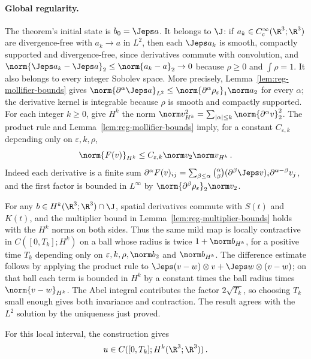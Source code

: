 \documentclass[11pt,reqno]{amsart}
\begin{document}
\paragraph{Global regularity.}
The theorem's initial state is $b_0=\Jeps a$. It belongs to $\J$: if
$a_k\in C_c^\infty(\R^3;\R^3)$ are divergence-free with $a_k\to a$ in
$L^2$, then each $\Jeps a_k$ is smooth, compactly supported and
divergence-free, since derivatives commute with convolution, and
$\norm{\Jeps a_k-\Jeps a}_2\le\norm{a_k-a}_2\to0$ because $\rho\ge0$ and
$\int\rho=1$. It also belongs to every integer Sobolev space. More
precisely,
Lemma~\ref{lem:reg-mollifier-bounds} gives
$\norm{\partial^\alpha\Jeps a}_{L^2}\le
\norm{\partial^\alpha\rho_\varepsilon}_1\norm a_2$ for every $\alpha$;
the derivative kernel is integrable because $\rho$ is smooth and compactly
supported. For each integer $k\ge0$, give $H^k$ the norm
$\norm v_{H^k}^2=\sum_{|\alpha|\le k}\norm{\partial^\alpha v}_2^2$.
The product rule and Lemma~\ref{lem:reg-mollifier-bounds} imply, for a
constant $C_{\varepsilon,k}$ depending only on $\varepsilon,k,\rho$,
\begin{equation}\label{eq:reg-hk-product}
  \norm{F(v)}_{H^k}\le C_{\varepsilon,k}\norm v_2\norm v_{H^k}\,.
\end{equation}
Indeed each derivative is a finite sum
$\partial^\alpha F(v)_{ij}=\sum_{\beta\le\alpha}\binom{\alpha}{\beta}
(\partial^\beta\Jeps v)_i\partial^{\alpha-\beta}v_j$, and the first
factor is bounded in $L^\infty$ by
$\norm{\partial^\beta\rho_\varepsilon}_2\norm v_2$.

For any $b\in H^k(\R^3;\R^3)\cap\J$, spatial derivatives commute with
$S(t)$ and $K(t)$, and the multiplier
bound in Lemma~\ref{lem:reg-multiplier-bounds} holds with the $H^k$ norms
on both sides. Thus the same mild map is locally contractive in
$C([0,T_k];H^k)$ on a ball whose radius is twice
$1+\norm b_{H^k}$, for a positive time $T_k$ depending only on
$\varepsilon,k,\rho,\norm b_2$ and $\norm b_{H^k}$. The difference
estimate follows by applying the product rule to
$\Jeps(v-w)\otimes v+\Jeps w\otimes(v-w)$; on that ball each term is
bounded in $H^k$ by a constant times the ball radius times
$\norm{v-w}_{H^k}$. The Abel integral contributes the factor $2\sqrt{T_k}$,
so choosing $T_k$ small enough gives both invariance and contraction. The
result agrees with the $L^2$ solution by the uniqueness just proved.

For this local interval, the construction gives
\begin{equation}\label{eq:reg-hk-energy}
  u\in C([0,T_k];H^k(\R^3;\R^3))\,.
\end{equation}
\end{document}
